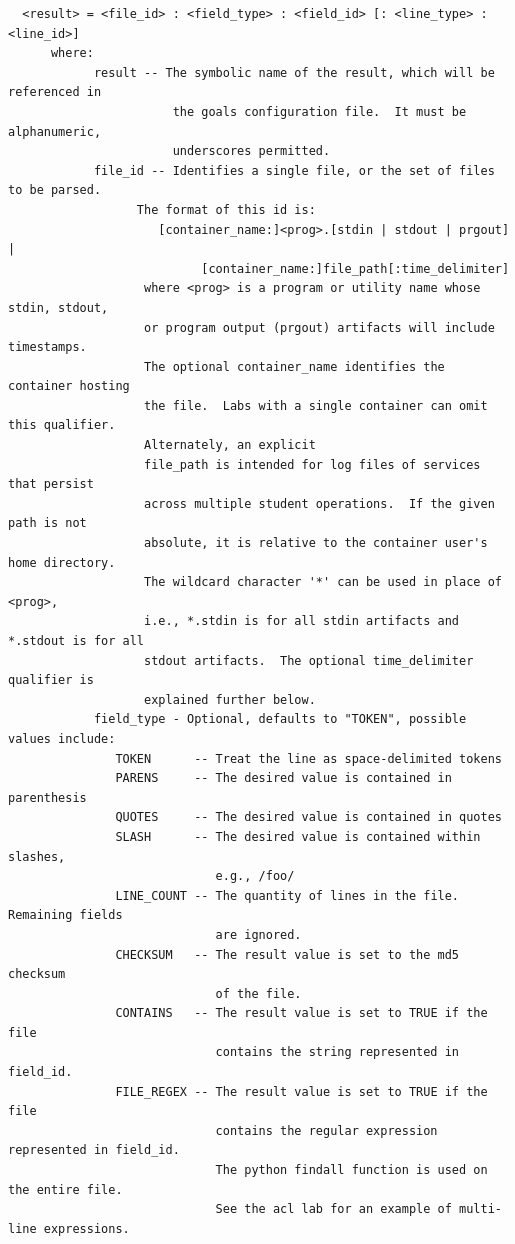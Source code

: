 \documentclass[12pt]{article}
\begin{document}
\begin{verbatim}
  <result> = <file_id> : <field_type> : <field_id> [: <line_type> : <line_id>]
      where:
            result -- The symbolic name of the result, which will be referenced in 
                       the goals configuration file.  It must be alphanumeric, 
                       underscores permitted.
            file_id -- Identifies a single file, or the set of files to be parsed.  
                  The format of this id is:
                     [container_name:]<prog>.[stdin | stdout | prgout] | 
                           [container_name:]file_path[:time_delimiter]
                   where <prog> is a program or utility name whose stdin, stdout,
                   or program output (prgout) artifacts will include timestamps.  
                   The optional container_name identifies the container hosting 
                   the file.  Labs with a single container can omit this qualifier.  
                   Alternately, an explicit 
                   file_path is intended for log files of services that persist 
                   across multiple student operations.  If the given path is not 
                   absolute, it is relative to the container user's home directory. 
                   The wildcard character '*' can be used in place of <prog>,
                   i.e., *.stdin is for all stdin artifacts and *.stdout is for all 
                   stdout artifacts.  The optional time_delimiter qualifier is 
                   explained further below.
            field_type - Optional, defaults to "TOKEN", possible values include:
               TOKEN      -- Treat the line as space-delimited tokens
               PARENS     -- The desired value is contained in parenthesis
               QUOTES     -- The desired value is contained in quotes
               SLASH      -- The desired value is contained within slashes, 
                             e.g., /foo/
               LINE_COUNT -- The quantity of lines in the file. Remaining fields 
                             are ignored.
               CHECKSUM   -- The result value is set to the md5 checksum 
                             of the file.
               CONTAINS   -- The result value is set to TRUE if the file 
                             contains the string represented in field_id.
               FILE_REGEX -- The result value is set to TRUE if the file 
                             contains the regular expression represented in field_id.
                             The python findall function is used on the entire file.
                             See the acl lab for an example of multi-line expressions.

\end{verbatim}
\end{document}
